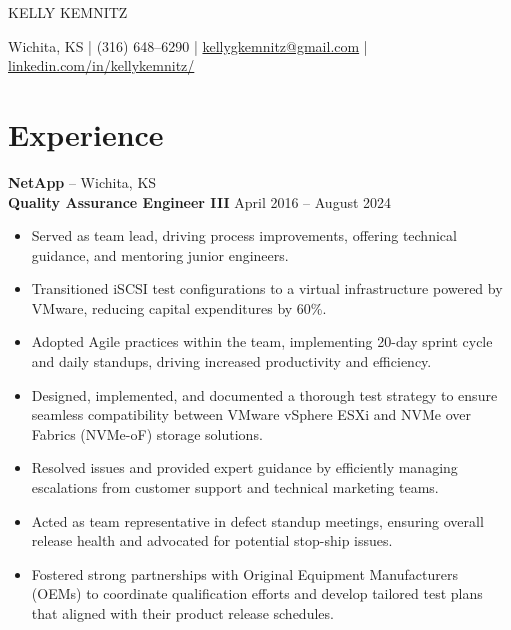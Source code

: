 \documentclass[11pt]{article}       %
\begin{document}
\centerline{\Huge KELLY KEMNITZ}

\vspace{5pt}

\centerline{Wichita, KS | (316) 648–6290 | \href{mailto:kellygkemnitz@gmail.com}{kellygkemnitz@gmail.com} | \href{https://www.linkedin.com/in/kellykemnitz/}{linkedin.com/in/kellykemnitz/}}

\vspace{-10pt}

\section*{Experience}
\textbf{NetApp} – Wichita, KS \\
\vpsace{2pt}
\textbf{Quality Assurance Engineer III} \hfill April 2016 – August 2024 \\
\vspace{-9pt}
\begin{itemize}
  \item Served as team lead, driving process improvements, offering technical guidance, and mentoring junior engineers.
  \item Transitioned iSCSI test configurations to a virtual infrastructure powered by VMware, reducing capital expenditures by 60\%.
  \item Adopted Agile practices within the team, implementing 20-day sprint cycle and daily standups, driving increased productivity and efficiency.
  \item Designed, implemented, and documented a thorough test strategy to ensure seamless compatibility between VMware vSphere ESXi and NVMe over Fabrics (NVMe-oF) storage solutions.
  \item Resolved issues and provided expert guidance by efficiently managing escalations from customer support and technical marketing teams.
  \item Acted as team representative in defect standup meetings, ensuring overall release health and advocated for potential stop-ship issues.
  \item Fostered strong partnerships with Original Equipment Manufacturers (OEMs) to coordinate qualification efforts and develop tailored test plans that aligned with their product release schedules.
\end{itemize}
\end{document}
